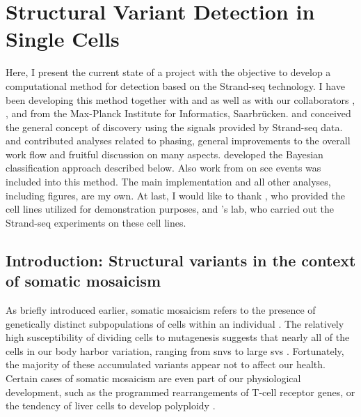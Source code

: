 \chapter{Structural Variant Detection in Single Cells}
\label{sec:mosaicatcher}

Here, I present the current state of a project with the objective to develop a
computational method for \sv detection based on the Strand-seq technology. I have been developing this method
together with \jan and \ashley as well as with our collaborators
\david, \maryam, and \marschall from the Max-Planck Institute for Informatics,
Saarbrücken. \ashley and \jan conceived the general concept of \sv discovery
using the signals provided by Strand-seq data. \marschall and \david
contributed analyses related to phasing, general improvements to the overall
work flow and fruitful discussion on many aspects. \maryam developed the
Bayesian classification approach described below. Also work from \venla on
\acl{sce} events was included into this method.
The main implementation and all other analyses, including figures, are my own.
At last, I would like to thank \balca, who provided the cell lines utilized for
demonstration purposes, and \landsdorp's lab, who carried out the Strand-seq
experiments on these cell lines.





\section{Introduction: Structural variants in the context of somatic mosaicism}
\label{sec:mosaic_mosaicism}

As briefly introduced earlier, somatic mosaicism refers to the presence of
genetically distinct subpopulations of cells within an individual
\citep{Youssoufian2002}. The relatively high susceptibility of dividing cells to mutagenesis
suggests that nearly all of the cells in our body harbor variation, ranging from \acp{snv}
to large \acp{sv} \citep{Campbell2015}. Fortunately, the majority of these
accumulated variants appear not to affect our health. Certain cases of somatic mosaicism are even
part of our physiological development, such as the programmed rearrangements of
T-cell receptor genes, or the tendency of liver cells to develop polyploidy
\citep{Forsberg2017,Davoli2011}.

